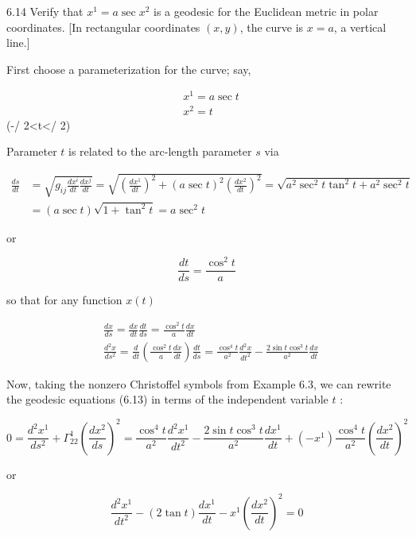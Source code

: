 \documentclass[10pt]{article}
\begin{document}
6.14 Verify that $x^{1}=a \sec x^{2}$ is a geodesic for the Euclidean metric in polar coordinates. [In rectangular coordinates $(x, y)$, the curve is $x=a$, a vertical line.]

First choose a parameterization for the curve; say,


\begin{align*}
& x^{1}=a \sec t  \tag{1}\\
& x^{2}=t
\end{align*} \quad(-\pi / 2<t<\pi / 2)


Parameter $t$ is related to the arc-length parameter $s$ via

$$
\begin{aligned}
\frac{d s}{d t} & =\sqrt{g_{i j} \frac{d x^{i}}{d t} \frac{d x^{j}}{d t}}=\sqrt{\left(\frac{d x^{1}}{d t}\right)^{2}+(a \sec t)^{2}\left(\frac{d x^{2}}{d t}\right)^{2}}=\sqrt{a^{2} \sec ^{2} t \tan ^{2} t+a^{2} \sec ^{2} t} \\
& =(a \sec t) \sqrt{1+\tan ^{2} t}=a \sec ^{2} t
\end{aligned}
$$

or

$$
\frac{d t}{d s}=\frac{\cos ^{2} t}{a}
$$

so that for any function $x(t)$

$$
\begin{aligned}
& \frac{d x}{d s}=\frac{d x}{d t} \frac{d t}{d s}=\frac{\cos ^{2} t}{a} \frac{d x}{d t} \\
& \frac{d^{2} x}{d s^{2}}=\frac{d}{d t}\left(\frac{\cos ^{2} t}{a} \frac{d x}{d t}\right) \frac{d t}{d s}=\frac{\cos ^{4} t}{a^{2}} \frac{d^{2} x}{d t^{2}}-\frac{2 \sin t \cos ^{3} t}{a^{2}} \frac{d x}{d t}
\end{aligned}
$$

Now, taking the nonzero Christoffel symbols from Example 6.3, we can rewrite the geodesic equations (6.13) in terms of the independent variable $t$ :

$$
0=\frac{d^{2} x^{1}}{d s^{2}}+\Gamma_{22}^{1}\left(\frac{d x^{2}}{d s}\right)^{2}=\frac{\cos ^{4} t}{a^{2}} \frac{d^{2} x^{1}}{d t^{2}}-\frac{2 \sin t \cos ^{3} t}{a^{2}} \frac{d x^{1}}{d t}+\left(-x^{1}\right) \frac{\cos ^{4} t}{a^{2}}\left(\frac{d x^{2}}{d t}\right)^{2}
$$

or


\begin{equation*}
\frac{d^{2} x^{1}}{d t^{2}}-(2 \tan t) \frac{d x^{1}}{d t}-x^{1}\left(\frac{d x^{2}}{d t}\right)^{2}=0 \tag{2}
\end{equation*}
\end{document}
